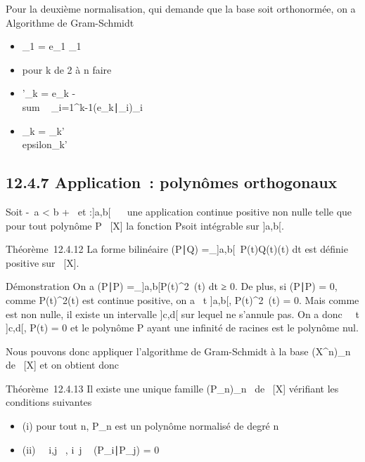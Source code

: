 \documentclass[]{article}
\begin{document}
Pour la deuxième normalisation, qui demande que la base soit
orthonormée, on a Algorithme de Gram-Schmidt

\begin{itemize}
\itemsep1pt\parskip0pt
\item
  \epsilon_1 = e_1\over
  \e_1\
\item
  pour k de 2 à n faire
\item
  \quad \quad \epsilon'_k = e_k
  -\\sum ~
  _i=1^k-1(e_k∣\epsilon_i)\epsilon_i
\item
  \quad \quad \epsilon_k =
  \epsilon_k'\over
  \\epsilon_k'\
\end{itemize}

\subsection{12.4.7 Application~: polynômes orthogonaux}

Soit -\infty~\leq a < b \leq +\infty~ et \omega :]a,b[\rightarrow~ ~ une application
continue positive non nulle telle que pour tout polynôme P \in {}~[X] la
fonction P\omega soit intégrable sur ]a,b[.

Théorème~12.4.12 La forme bilinéaire (P∣Q)
=\int  _]a,b[~P(t)Q(t)\omega(t) dt est
définie positive sur \mathbb{R}~[X].

Démonstration On a (P∣P)
=\int  _]a,b[P(t)^2~\omega(t)
dt ≥ 0. De plus, si (P∣P) = 0, comme
P(t)^2\omega(t) est continue positive, on a
\forall~t \in]a,b[, P(t)^2~\omega(t) = 0. Mais
comme \omega est non nulle, il existe un intervalle ]c,d[ sur lequel \omega ne
s'annule pas. On a donc \forall~~t \in]c,d[, P(t) =
0 et le polynôme P ayant une infinité de racines est le polynôme nul.

Nous pouvons donc appliquer l'algorithme de Gram-Schmidt à la base
(X^n)_n\in{}~ de ~[X] et on obtient donc

Théorème~12.4.13 Il existe une unique famille
(P_n)_n\in{}~ de ~[X] vérifiant les conditions
suivantes

\begin{itemize}
\itemsep1pt\parskip0pt
\item
  (i) pour tout n, P_n est un polynôme normalisé de degré n
\item
  (ii) \forall~~i,j \in \mathbb{N}~,
  i\neq~j \rigtharrow~
  (P_i∣P_j) = 0
\end{itemize}
\end{document}
